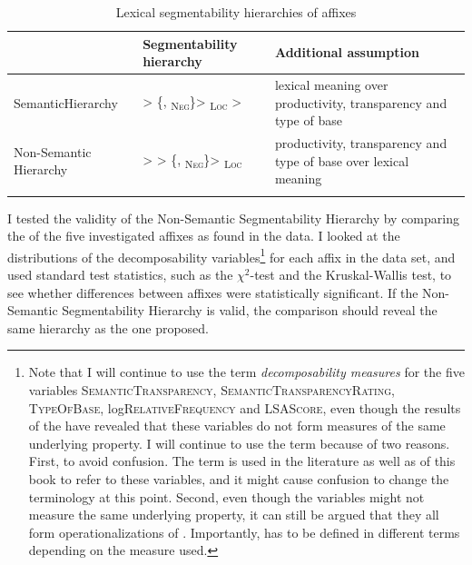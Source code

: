 \begin{table}
\begin{tabularx}{\textwidth}{p{2.25cm}lQ}
	\lsptoprule
	& {Segmentability hierarchy} & {Additional assumption} \\\midrule
	Semantic\newline Hierarchy &  > \{, \textsubscript{\textsc{Neg}}\}>  \textsubscript{\textsc{Loc}} > & lexical meaning over productivity, transparency and type of base\\\tablevspace
	Non-Semantic Hierarchy&  	 >  > \{, \textsubscript{\textsc{Neg}}\}>  \textsubscript{\textsc{Loc}}& productivity, transparency and  type of base	over lexical meaning\\
	\lspbottomrule
\end{tabularx}
	\caption{Lexical segmentability hierarchies of  affixes\label{fig:Segmentability hierarchies of  affixes repetition 2}}
\end{table}


I tested the validity of the Non-Semantic Segmentability Hierarchy by comparing the  of the five investigated affixes as found in the data. I looked at the distributions of the decomposability variables\footnote{Note that I will continue to use the term \textit{{decomposability} measures} for the five variables \textsc{SemanticTransparency}, \textsc{SemanticTransparencyRating}, \textsc{TypeOfBase}, log\textsc{RelativeFrequency} and \textsc{LSAScore}, even though the results of the  have revealed that these variables do not form measures of the same underlying property. I will continue to use the term  because of two reasons. First, to avoid confusion. The term is used in the literature as well as  of this book to refer to these variables, and it might cause confusion to change the terminology at this point. Second, even though the variables might not measure the same underlying property, it can still be argued that they all form operationalizations of . Importantly,  has to be defined in different terms depending on the  measure used.} for each affix in the data set, and used standard test statistics, such as the $\chi^2$-test and the Kruskal-Wallis test, to see whether differences between affixes were statistically significant.
If the Non-Semantic Segmentability Hierarchy is valid, the comparison should reveal the same  hierarchy  as the one proposed. 



